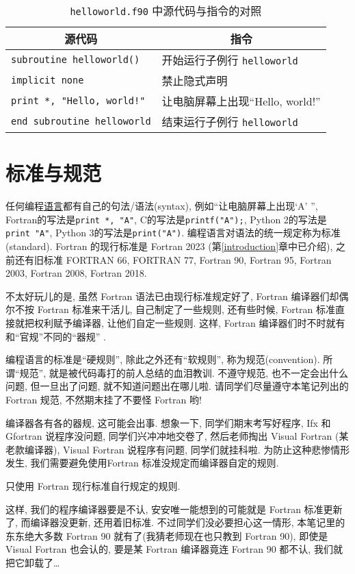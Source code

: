 \begin{table}[!htbp]
    \centering
    \begin{tabular}{|p{}|p{}|}
        \hline
        \multicolumn{1}{|c|}{源代码}&\multicolumn{1}{|c|}{指令}\\
        \hline
        \texttt{subroutine helloworld()}&开始运行子例行 \texttt{helloworld}\\
        \hline
        \texttt{implicit none}&禁止隐式声明\\
        \hline
        \texttt{print *, "Hello, world!"}&让电脑屏幕上出现``Hello, world!''\\
        \hline
        \texttt{end subroutine helloworld}&结束运行子例行 \texttt{helloworld}\\
        \hline
    \end{tabular}
    \caption{\texttt{helloworld.f90} 中源代码与指令的对照}\label{source_and_command_helloworld}
\end{table}

\section{标准与规范}

任何编程\uline{语言}都有自己的句法/语法(syntax), 例如``让电脑屏幕上出现`A' '', Fortran的写法是\texttt{print *, "A"}, C的写法是\texttt{printf("A");}, Python 2的写法是\texttt{print "A"}, Python 3的写法是\texttt{print("A")}. 编程语言对语法的统一规定称为标准(standard). Fortran 的现行标准是 Fortran 2023 (第\ref{introduction}章中已介绍), 之前还有旧标准 FORTRAN 66, FORTRAN 77, Fortran 90, Fortran 95, Fortran 2003, Fortran 2008, Fortran 2018.

不太好玩儿的是, 虽然 Fortran 语法已由现行标准规定好了, Fortran 编译器们却偶尔不按 Fortran 标准来干活儿, 自己制定了一些规则, 还有些时候, Fortran 标准直接就把权利赋予编译器, 让他们自定一些规则. 这样, Fortran 编译器们时不时就有和``官规''不同的``器规'' .

编程语言的标准是``硬规则'', 除此之外还有``软规则'', 称为规范(convention). 所谓``规范'', 就是被代码毒打的前人总结的血泪教训. 不遵守规范, 也不一定会出什么问题, 但一旦出了问题, 就不知道问题出在哪儿啦. 请同学们尽量遵守本笔记列出的 Fortran 规范, 不然期末挂了不要怪 Fortran 哟!

编译器各有各的器规, 这可能会出事. 想象一下, 同学们期末考写好程序, Ifx 和 Gfortran 说程序没问题, 同学们兴冲冲地交卷了, 然后老师掏出 Visual Fortran (某老款编译器), Visual Fortran 说程序有问题, 同学们就挂科啦. 为防止这种悲惨情形发生, 我们需要避免使用Fortran 标准没规定而编译器自定的规则.
\begin{convention}
    只使用 Fortran 现行标准自行规定的规则.
\end{convention}
这样, 我们的程序编译器要是不认, 安安唯一能想到的可能就是 Fortran 标准更新了, 而编译器没更新, 还用着旧标准. 不过同学们没必要担心这一情形, 本笔记里的东东绝大多数 Fortran 90 就有了(我猜老师现在也只教到 Fortran 90), 即使是 Visual Fortran 也会认的, 要是某 Fortran 编译器竟连 Fortran 90 都不认, 我们就把它卸载了\dots{}

